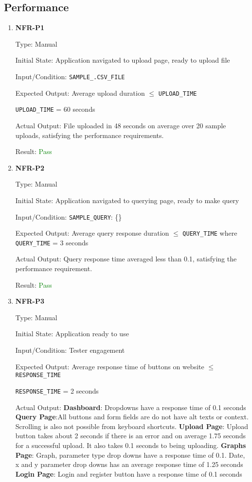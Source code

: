 \documentclass[12pt, titlepage]{article}
\begin{document}
\subsection{Performance}
\begin{enumerate}
  \item{\textbf{NFR-P1}} \label{NFR:P1}

Type: Manual

Initial State: Application navigated to upload page, ready to upload file

Input/Condition: \texttt{SAMPLE\_.CSV\_FILE}

Expected Output: Average upload duration $\leq$ \texttt{UPLOAD\_TIME}

\texttt{UPLOAD\_TIME} = 60 seconds

Actual Output: File uploaded in 48 seconds on average over 20 sample uploads,
satisfying the performance requirements.

Result: \textcolor{green}{Pass}

  \item{\textbf{NFR-P2}} \label{NFR:P2}

Type: Manual

Initial State: Application navigated to querying page, ready to make query

Input/Condition: \texttt{SAMPLE\_QUERY}: \{\}

Expected Output: Average query response duration $\leq$ \texttt{QUERY\_TIME}
where \texttt{QUERY\_TIME} = 3 seconds

Actual Output: Query response time averaged less than 0.1, satisfying the
performance requirement.

Result: \textcolor{green}{Pass}

\item{\textbf{NFR-P3}} \label{NFR:P3}

Type: Manual

Initial State: Application ready to use

Input/Condition: Tester engagement

Expected Output: Average response time of buttons on website $\leq$
\texttt{RESPONSE\_TIME}

\texttt{RESPONSE\_TIME} = 2 seconds

Actual Output: \newline
\textbf{Dashboard}: Dropdowns have a response time of 0.1 seconds \newline
\textbf{Query Page}:All buttons and form fields are do not have alt texts or
context. Scrolling is also not possible from keyboard shortcuts. \newline
\textbf{Upload Page}: Upload button takes about 2 seconds if there is an error
and on average 1.75 seconds for a successful upload. It also takes 0.1 seconds
to being uploading. \newline
\textbf{Graphs Page}: Graph, parameter type drop downs have a response time of
0.1. Date, x and y parameter drop downs has an average response time of 1.25
seconds \newline
\textbf{Login Page}: Login and register button have a response time of 0.1
seconds


\end{enumerate}
\end{document}
